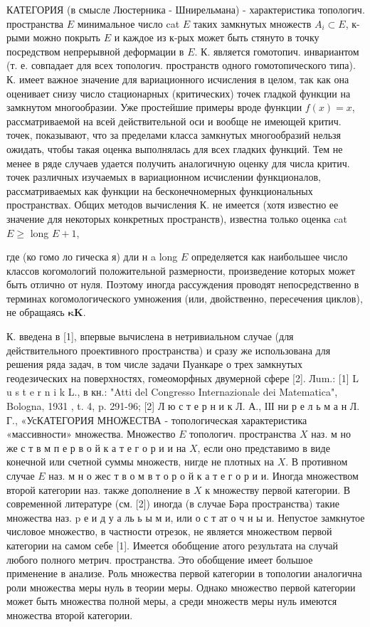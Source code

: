 \documentclass[10pt]{article}
\begin{document}
КАТЕГОРИЯ (в смысле Люстерника - Шнирельмана) - характеристика топологич. пространства $E$ минимальное число cat $E$ таких замкнутых множеств $A_{i} \subset E$, к-рыми можно покрыть $E$ и каждое из к-рых может быть стянуто в точку посредством непрерывной деформации в $E$. К. является гомотопич. инвариантом (т. е. совпадает для всех топологич. пространств одного гомотопического типа). К. имеет важное значение для вариационного исчисления в целом, так как она оценивает снизу число стационарных (критических) точек гладкой функции на замкнутом многообразии. Уже простейшие примеры вроде функции $f(x)=x$, рассматриваемой на всей действительной оси и вообще не имеющей критич. точек, показывают, что за пределами класса замкнутых многообразий нельзя ожидать, чтобы такая оценка выполнялась для всех гладких функций. Тем не менее в ряде случаев удается получить аналогичную оценку для числа критич. точек различных изучаемых в вариационном исчислении функционалов, рассматриваемых как функции на бесконечномерных функциональных пространствах. Общих методов вычисления К. не имеется (хотя известно ее значение для некоторых конкретных пространств), известна только оценка cat $E \geqslant$ long $E+1$,



где (ко гомо ло гическа я) дли н a long $E$ определяется как наибольшее число классов когомологий положительной размерности, произведение которых может быть отлично от нуля. Поэтому иногда рассуждения проводят непосредственно в терминах когомологического умножения (или, двойственно, пересечения циклов), не обращаясь $\mathbf{\kappa} \boldsymbol{K}$.



К. введена в [1], впервые вычислена в нетривиальном случае (для действительного проективного пространства) и сразу же использована для решения ряда задач, в том числе задачи Пуанкаре о трех замкнутых геодезических на поверхностях, гомеоморфных двумерной сфере [2]. Лum.: [1] L u s t e r n i k L., в кн.: "Atti del Congresso Internazionale dei Matematica", Bologna, 1931 , t. 4, p. 291-96; [2] Л ю с т е р н и к Л. А., ІІІ ни р е л ь м а н Л. Г., «УсКАТЕГОРИЯ МНОЖЕСТВА - топологическая характеристика «массивности» множества. Множество $E$ топологич. пространства $X$ наз. м но же с т в м п е р в о й к а т е г о р и и на $X$, если оно представимо в виде конечной или счетной суммы множеств, нигде не плотных на $X$. В противном случае $E$ наз. м н о жес т в о м в т о р о й к а т е г о р и и. Иногда множеством второй категории наз. также дополнение в $X$ к множеству первой категории. В современной литературе (см. [2]) иногда (в случае Бәра пространства) такие множества наз. $\mathrm{p}$ е и д у а ль ь ы м и, или о с т ат о ч н ы и. Непустое замкнутое числовое множество, в частности отрезок, не является множеством первой категории на самом себе [1]. Имеется обобщение атого результата на случай любого полного метрич. пространства. Это обобщение имеет большое применение в анализе. Роль множества первой категории в топологии аналогична роли множества меры нуль в теории меры. Однако множество первой категории может быть множества полной меры, а среди множеств меры нуль имеются множества второй категории.
\end{document}
